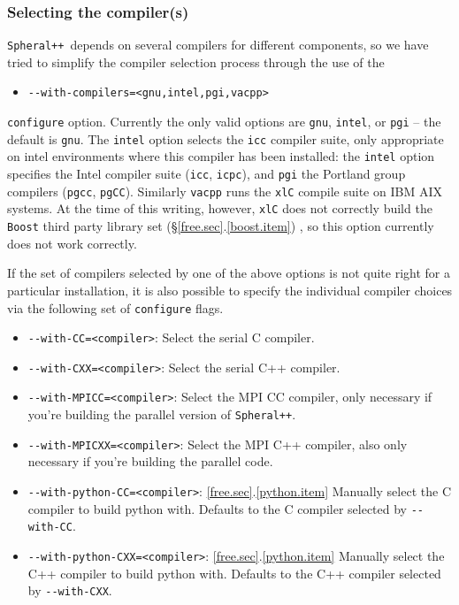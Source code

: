 \documentclass{article}
\newcommand{\Spheral}{{\tt Spheral++}}
\begin{document}
\subsubsection{Selecting the compiler(s)}
\Spheral\ depends on several compilers for different components, so we have tried to simplify the compiler selection process through the use of the
\begin{itemize}
\item \verb+--with-compilers=<gnu,intel,pgi,vacpp>+
\end{itemize}
{\tt configure} option.  Currently the only valid options are {\tt gnu}, {\tt intel}, or {\tt pgi} -- the default is {\tt gnu}.  The {\tt intel} option selects the {\tt icc} compiler suite, only appropriate on intel environments where this compiler has been installed: the {\tt intel} option specifies the Intel compiler suite ({\tt icc}, {\tt icpc}), and {\tt pgi} the Portland group compilers ({\tt pgcc}, {\tt pgCC}).  Similarly {\tt vacpp} runs the {\tt xlC} compile suite on IBM AIX systems.  At the time of this writing, however, {\tt xlC} does not correctly build the {\tt Boost} third party library set (\S \ref{free.sec}.\ref{boost.item}) , so this option currently does not work correctly.

If the set of compilers selected by one of the above options is not quite right for a particular installation, it is also possible to specify the individual compiler choices via the following set of {\tt configure} flags.
\begin{itemize}
\item \verb+--with-CC=<compiler>+: Select the serial C compiler.
\item \verb+--with-CXX=<compiler>+: Select the serial C++ compiler.
\item \verb+--with-MPICC=<compiler>+: Select the MPI CC compiler, only necessary if you're building the parallel version of \Spheral.
\item \verb+--with-MPICXX=<compiler>+: Select the MPI C++ compiler, also only necessary if you're building the parallel code.
\item \verb+--with-python-CC=<compiler>+: \ref{free.sec}.\ref{python.item} Manually select the C compiler to build python with.  Defaults to the C compiler selected by \verb+--with-CC+.
\item \verb+--with-python-CXX=<compiler>+: \ref{free.sec}.\ref{python.item} Manually select the C++ compiler to build python with.  Defaults to the C++ compiler selected by \verb+--with-CXX+.
\end{itemize}
\end{document}
